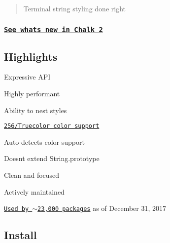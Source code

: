 \section*{~\newline
 ~\newline
  ~\newline
 ~\newline
 ~\newline
 }

\begin{quote}
Terminal string styling done right \end{quote}


\href{https://travis-ci.org/chalk/chalk}{\tt } \href{https://coveralls.io/github/chalk/chalk?branch=master}{\tt } \href{https://www.youtube.com/watch?v=9auOCbH5Ns4}{\tt } \href{https://github.com/xojs/xo}{\tt } \href{https://github.com/sindresorhus/awesome-nodejs}{\tt }

\subsubsection*{\href{https://github.com/chalk/chalk/releases/tag/v2.0.0}{\tt See what\textquotesingle{}s new in Chalk 2}}



\subsection*{Highlights}


\begin{DoxyItemize}
\item Expressive A\+PI
\item Highly performant
\item Ability to nest styles
\item \href{#256-and-truecolor-color-support}{\tt 256/\+Truecolor color support}
\item Auto-\/detects color support
\item Doesn\textquotesingle{}t extend {\ttfamily String.\+prototype}
\item Clean and focused
\item Actively maintained
\item \href{https://www.npmjs.com/browse/depended/chalk}{\tt Used by $\sim$23,000 packages} as of December 31, 2017
\end{DoxyItemize}

\subsection*{Install}


